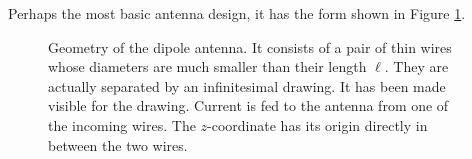 	\begin{exmp}
		Perhaps the most basic antenna design, it has the form shown in 
		Figure \ref{fig:active.antennae.dipoleAntenna}. 
		
				\begin{figure}
					\begin{center}
					
					\vspace{0.1cm}
					\end{center}
					\caption[Geometry of the dipole antenna]
							{Geometry of the dipole antenna. It consists of a pair of thin
							wires whose diameters are much smaller than their length $\ell$.
							They are actually separated by an infinitesimal drawing. It has
							been made visible for the drawing. Current is fed to the antenna
							from one of the incoming wires. The $z$-coordinate has its origin
							directly in between the two wires.}
					\label{fig:active.antennae.dipoleAntenna}
				\end{figure}
		

\end{exmp}
